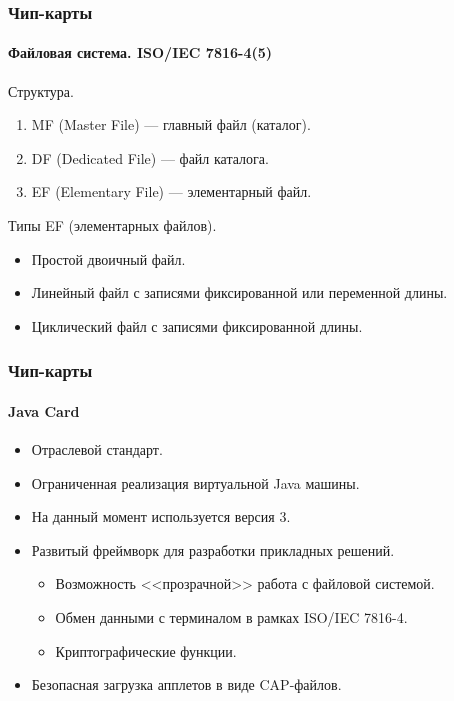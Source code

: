 \begin{frame}
    \frametitle{Чип-карты}
    \framesubtitle{Файловая система. ISO/IEC 7816-4(5)}
    Структура.
    \begin{enumerate}
        \item MF (Master File) --- главный файл (каталог). 
        \item DF (Dedicated File) --- файл каталога. 
        \item EF (Elementary File) --- элементарный файл. 
    \end{enumerate}
    Типы EF (элементарных файлов).
    \begin{itemize}
        \item Простой двоичный файл.
        \item Линейный файл с записями фиксированной или переменной длины.
        \item Циклический файл с записями фиксированной длины.
    \end{itemize}
\end{frame}


\begin{frame}
    \frametitle{Чип-карты}
    \framesubtitle{Java Card}
    
    \begin{itemize}
        \item Отраслевой стандарт.
        \item Ограниченная реализация виртуальной Java машины.
        \item На данный момент используется версия 3.
        \item Развитый фреймворк для разработки прикладных решений.
        \begin{itemize}
            \item Возможность <<прозрачной>> работа с файловой системой.
            \item Обмен данными с терминалом в рамках ISO/IEC 7816-4.
            \item Криптографические функции.
        \end{itemize}
        \item Безопасная загрузка апплетов в виде CAP-файлов.
    \end{itemize}
\end{frame}


